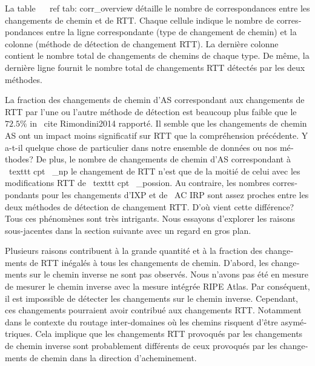 \begin{otherlanguage}{french}
{{{La table ~ \ ref {tab: corr_overview} détaille le nombre de correspondances entre les changements de chemin et de RTT.
Chaque cellule indique le nombre de correspondances entre la ligne correspondante (type de changement de chemin) et la colonne (méthode de détection de changement RTT).
La dernière colonne contient le nombre total de changements de chemins de chaque type.
De même, la dernière ligne fournit le nombre total de changements RTT détectés par les deux méthodes.

La fraction des changements de chemin d'AS correspondant aux changements de RTT par l'une ou l'autre méthode de détection est beaucoup plus faible que le $ 72.5 \% $ in \ cite {Rimondini2014} rapporté.
Il semble que les changements de chemin AS ont un impact moins significatif sur RTT que la compréhension précédente.
Y a-t-il quelque chose de particulier dans notre ensemble de données ou nos méthodes?
De plus, le nombre de changements de chemin d'AS correspondant à \ texttt {cpt \ _np} le changement de RTT n'est que de la moitié de celui avec les modifications RTT de \ texttt {cpt \ _possion}.
Au contraire, les nombres correspondants pour les changements d'IXP et de \ AC {IRP} sont assez proches entre les deux méthodes de détection de changement RTT.
D'où vient cette différence?
Tous ces phénomènes sont très intrigants.
Nous essayons d'explorer les raisons sous-jacentes dans la section suivante avec un regard en gros plan.

Plusieurs raisons contribuent à la grande quantité et à la fraction des changements de RTT inégalés à tous les changements de chemin.
D'abord, les changements sur le chemin inverse ne sont pas observés.
Nous n'avons pas été en mesure de mesurer le chemin inverse avec la mesure intégrée RIPE Atlas.
Par conséquent, il est impossible de détecter les changements sur le chemin inverse.
Cependant, ces changements pourraient avoir contribué aux changements RTT.
Notamment dans le contexte du routage inter-domaines où les chemins risquent d'être asymétriques.
Cela implique que les changements RTT provoqués par les changements de chemin inverse sont probablement différents de ceux provoqués par les changements de chemin dans la direction d'acheminement.

}}}
\end{otherlanguage}
